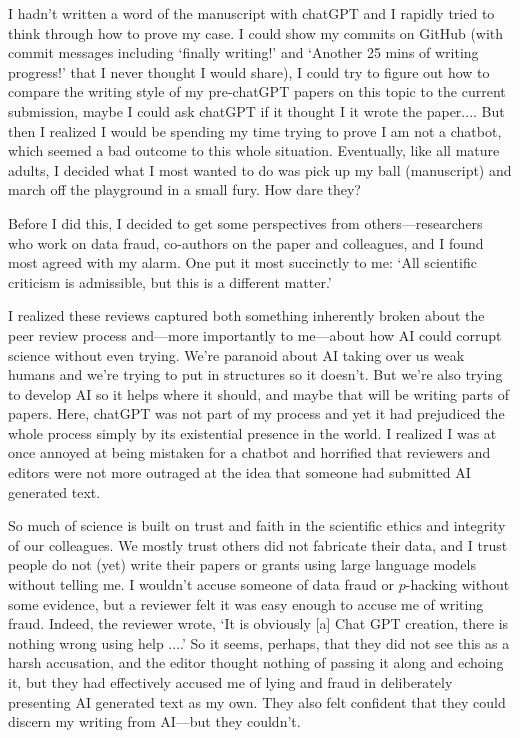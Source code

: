 \documentclass[11pt]{article}
\begin{document}
I hadn't written a word of the manuscript with chatGPT and I rapidly tried to think through how to prove my case. I could show my commits on GitHub (with commit messages including `finally writing!' and `Another 25 mins of writing progress!' that I never thought I would share), I could try to figure out how to compare the writing style of my pre-chatGPT papers on this topic to the current submission, maybe I could ask chatGPT if it thought I it wrote the paper.... But then I realized I would be spending my time trying to prove I am not a chatbot, which seemed a bad outcome to this whole situation. Eventually,  like all mature adults, I decided what I most wanted to do was pick up my ball (manuscript) and march off the playground in a small fury. How dare they? 

Before I did this, I decided to get some perspectives from others---researchers who work on data fraud, co-authors on the paper and colleagues, and I found most agreed with my alarm. One put it most succinctly to me: `All scientific criticism is admissible, but this is a different matter.' 

I realized these reviews captured both something inherently broken about the peer review process and---more importantly to me---about how AI could corrupt science without even trying. We're paranoid about AI taking over us weak humans and we're trying to put in structures so it doesn't. But we're also trying to develop AI so it helps where it should, and maybe that will be writing parts of papers. Here, chatGPT was not part of my process and yet it had prejudiced the whole process simply by its existential presence in the world. I realized I was at once annoyed at being mistaken for a chatbot and horrified that reviewers and editors were not more outraged at the idea that someone had submitted AI generated text.

So much of science is built on trust and faith in the scientific ethics and integrity of our colleagues. We mostly trust others did not fabricate their data, and I trust people do not (yet) write their papers or grants using large language models without telling me. I wouldn't accuse someone of data fraud or $p$-hacking without some evidence, but a reviewer felt it was easy enough to accuse me of writing fraud. Indeed, the reviewer wrote, `It is obviously [a] Chat GPT creation, there is nothing wrong using help ....' So it seems, perhaps, that they did not see this as a harsh accusation, and the editor thought nothing of passing it along and echoing it, but they had effectively accused me of lying and fraud in deliberately presenting AI generated text as my own. They also felt confident that they could discern my writing from AI---but they couldn't. %
\end{document}
